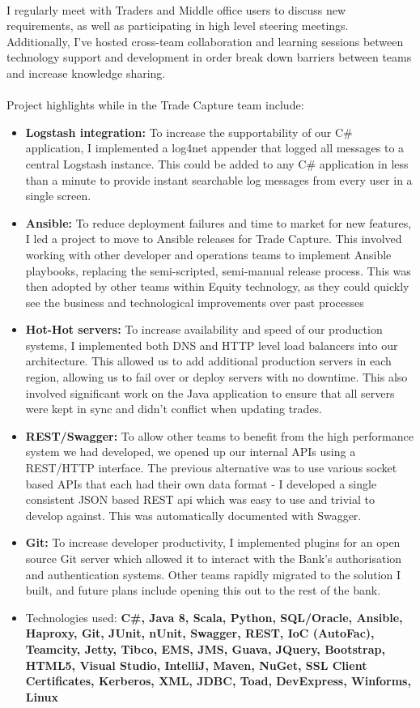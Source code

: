\documentclass[11pt,a4paper, roman]{moderncv} %
\begin{document}
{\\I regularly meet with Traders and Middle office users to discuss new requirements, as well as participating in high level steering meetings. Additionally, I've hosted cross-team collaboration and learning sessions between technology support and development in order break down barriers between teams and increase knowledge sharing.
\\\\Project highlights while in the Trade Capture team include:
\begin{itemize}
\item \textbf{Logstash integration:} To increase the supportability of our C\# application, I implemented a log4net appender that logged all messages to a central Logstash instance. This could be added to any C\# application in less than a minute to provide instant searchable log messages from every user in a single screen.
\item \textbf{Ansible:} To reduce deployment failures and time to market for new features, I led a project to move to Ansible releases for Trade Capture. This involved working with other developer and operations teams to implement Ansible playbooks, replacing the semi-scripted, semi-manual release process. This was then adopted by other teams within Equity technology, as they could quickly see the business and technological improvements over past processes
\item \textbf{Hot-Hot servers:} To increase availability and speed of our production systems, I implemented both DNS and HTTP level load balancers into our architecture. This allowed us to add additional production servers in each region, allowing us to fail over or deploy servers with no downtime. This also involved significant work on the Java application to ensure that all servers were kept in sync and didn't conflict when updating trades.
\item \textbf{REST/Swagger:} To allow other teams to benefit from the high performance system we had developed, we opened up our internal APIs using a REST/HTTP interface. The previous alternative was to use various socket based APIs that each had their own data format - I developed a single consistent JSON based REST api which was easy to use and trivial to develop against. This was automatically documented with Swagger.
\item \textbf{Git:} To increase developer productivity, I implemented plugins for an open source Git server which allowed it to interact with the Bank's authorisation and authentication systems. Other teams rapidly migrated to the solution I built, and future plans include opening this out to the rest of the bank.
\item {Technologies used:} \textbf{C\#, Java 8, Scala, Python, SQL/Oracle, Ansible, Haproxy, Git, JUnit, nUnit, Swagger, REST, IoC (AutoFac), Teamcity, Jetty, Tibco, EMS, JMS, Guava, JQuery, Bootstrap, HTML5, Visual Studio, IntelliJ, Maven, NuGet, SSL Client Certificates, Kerberos, XML, JDBC, Toad, DevExpress, Winforms, Linux}
\end{itemize}
}
\end{document}
